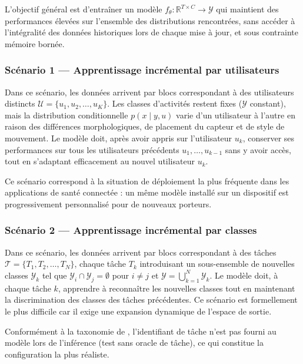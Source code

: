 L'objectif général est d'entraîner un modèle $f_\theta : \mathbb{R}^{T \times C} \to \mathcal{Y}$ qui maintient des performances élevées sur l'ensemble des distributions rencontrées, sans accéder à l'intégralité des données historiques lors de chaque mise à jour, et sous contrainte mémoire bornée.

\subsubsection{Scénario 1 — Apprentissage incrémental par utilisateurs}

Dans ce scénario, les données arrivent par blocs correspondant à des utilisateurs distincts $\mathcal{U} = \{u_1, u_2, \ldots, u_K\}$. Les classes d'activités restent fixes ($\mathcal{Y}$ constant), mais la distribution conditionnelle $p(x \mid y, u)$ varie d'un utilisateur à l'autre en raison des différences morphologiques, de placement du capteur et de style de mouvement. Le modèle doit, après avoir appris sur l'utilisateur $u_k$, conserver ses performances sur tous les utilisateurs précédents $u_1, \ldots, u_{k-1}$ sans y avoir accès, tout en s'adaptant efficacement au nouvel utilisateur $u_k$.

Ce scénario correspond à la situation de déploiement la plus fréquente dans les applications de santé connectée : un même modèle installé sur un dispositif est progressivement personnalisé pour de nouveaux porteurs.

\subsubsection{Scénario 2 — Apprentissage incrémental par classes}

Dans ce scénario, les données arrivent par blocs correspondant à des tâches $\mathcal{T} = \{T_1, T_2, \ldots, T_N\}$, chaque tâche $T_k$ introduisant un sous-ensemble de nouvelles classes $\mathcal{Y}_k$ tel que $\mathcal{Y}_i \cap \mathcal{Y}_j = \emptyset$ pour $i \neq j$ et $\mathcal{Y} = \bigcup_{k=1}^{N} \mathcal{Y}_k$. Le modèle doit, à chaque tâche $k$, apprendre à reconnaître les nouvelles classes tout en maintenant la discrimination des classes des tâches précédentes. Ce scénario est formellement le plus difficile car il exige une expansion dynamique de l'espace de sortie.

Conformément à la taxonomie de \parencite{vdven2022}, l'identifiant de tâche n'est pas fourni au modèle lors de l'inférence (test sans oracle de tâche), ce qui constitue la configuration la plus réaliste.

